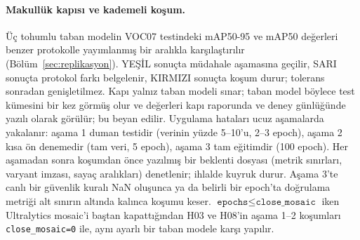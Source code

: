 \documentclass[pdflatex,iicol,sn-mathphys-num]{sn-jnl}
\begin{document}
\paragraph{Makullük kapısı ve kademeli koşum.}
Üç tohumlu taban modelin VOC07 testindeki mAP50-95 ve mAP50 değerleri benzer protokolle yayımlanmış bir aralıkla karşılaştırılır (Bölüm~\ref{sec:replikasyon}). YEŞİL sonuçta müdahale aşamasına geçilir, SARI sonuçta protokol farkı belgelenir, KIRMIZI sonuçta koşum durur; tolerans sonradan genişletilmez. Kapı yalnız taban modeli sınar; taban model böylece test kümesini bir kez görmüş olur ve değerleri kapı raporunda ve deney günlüğünde yazılı olarak görülür; bu beyan edilir. Uygulama hataları ucuz aşamalarda yakalanır: aşama 1 duman testidir (verinin yüzde 5--10'u, 2--3 epoch), aşama 2 kısa ön denemedir (tam veri, 5 epoch), aşama 3 tam eğitimdir (100 epoch). Her aşamadan sonra koşumdan önce yazılmış bir beklenti dosyası (metrik sınırları, varyant imzası, sayaç aralıkları) denetlenir; ihlalde kuyruk durur. Aşama 3'te canlı bir güvenlik kuralı NaN oluşunca ya da belirli bir epoch'ta doğrulama metriği alt sınırın altında kalınca koşumu keser. $\texttt{epochs}\le\texttt{close\_mosaic}$ iken Ultralytics mosaic'i baştan kapattığından H03 ve H08'in aşama 1--2 koşumları \texttt{close\_mosaic=0} ile, aynı ayarlı bir taban modele karşı yapılır.
\end{document}
